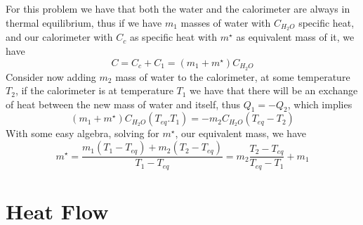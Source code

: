 \documentclass[../qm.tex]{subfiles}
\begin{document}
For this problem we have that both the water and the calorimeter are always in thermal equilibrium, thus if we have $m_1$ masses of water with $C_{H_2O}$ specific heat, and our calorimeter with $C_c$ as specific heat with $m^\star$ as equivalent mass of it, we have
\begin{equation*}
	C=C_c+C_{1}=\left( m_1+m^\star \right)C_{H_2O}
\end{equation*}
Consider now adding $m_2$ mass of water to the calorimeter, at some temperature $T_2$, if the calorimeter is at temperature $T_1$ we have that there will be an exchange of heat between the new mass of water and itself, thus $Q_1=-Q_2$, which implies
\begin{equation*}
	\left( m_1+m^\star \right)C_{H_2O}\left( T_{eq}.T_{1} \right)=-m_2C_{H_2O}\left( T_{eq}-T_2 \right)
\end{equation*}
With some easy algebra, solving for $m^\star$, our equivalent mass, we have
\begin{equation}
	m^\star=\frac{m_1\left( T_{1}-T_{eq} \right)+m_2\left( T_2-T_{eq} \right)}{T_1-T_{eq}}=m_2\frac{T_2-T_{eq}}{T_{eq}-T_1}+m_1
	\label{eq:equivalentmass.cal}
\end{equation}
\section{Heat Flow}
\end{document}
